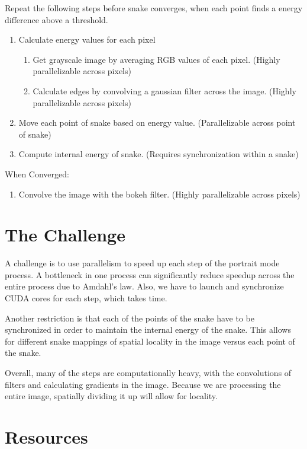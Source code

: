 \documentclass[12pt]{article}
\begin{document}
Repeat the following steps before snake converges, when each point finds a
energy difference above a threshold.
\begin{enumerate}
    \item
        Calculate energy values for each pixel
        \begin{enumerate}
            \item
                Get grayscale image by averaging RGB values of each pixel.
                (Highly parallelizable across pixels)
            \item
                Calculate edges by convolving a gaussian filter across the
                image. (Highly parallelizable across pixels)
        \end{enumerate}
    \item
        Move each point of snake based on energy value. (Parallelizable across
        point of snake)
    \item
        Compute internal energy of snake. (Requires synchronization within a
        snake)
\end{enumerate}

When Converged:
\begin{enumerate}
    \item
        Convolve the image with the bokeh filter. (Highly parallelizable across
        pixels)
\end{enumerate}

\section{The Challenge}

A challenge is to use parallelism to speed up each step of the portrait mode
process. A bottleneck in one process can significantly reduce speedup across
the entire process due to Amdahl's law. Also, we have to launch and synchronize
CUDA cores for each step, which takes time.

Another restriction is that each of the points of the snake have to be
synchronized in order to maintain the internal energy of the snake. This allows
for different snake mappings of spatial locality in the image versus each point
of the snake.

Overall, many of the steps are computationally heavy, with the convolutions of
filters and calculating gradients in the image. Because we are processing the
entire image, spatially dividing it up will allow for locality.

\section{Resources}
\end{document}
